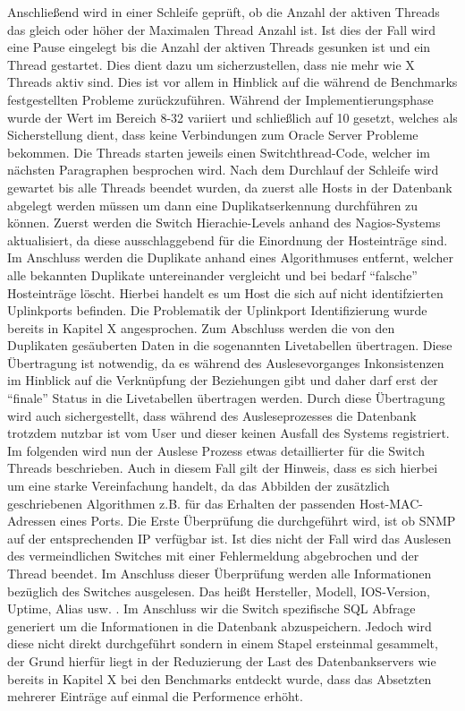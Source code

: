Anschließend wird in einer Schleife geprüft, ob die Anzahl der aktiven Threads das gleich oder höher der Maximalen Thread Anzahl ist. Ist dies der Fall wird eine Pause eingelegt bis die Anzahl der aktiven Threads gesunken ist und ein Thread gestartet. Dies dient dazu um sicherzustellen, dass nie mehr wie X Threads aktiv sind. Dies ist vor allem in Hinblick auf die während de Benchmarks festgestellten Probleme zurückzuführen. Während der Implementierungsphase wurde der Wert im Bereich 8-32 variiert und schließlich auf 10 gesetzt, welches als Sicherstellung dient, dass keine Verbindungen zum Oracle Server Probleme bekommen. Die Threads starten jeweils einen Switchthread-Code, welcher im nächsten Paragraphen besprochen wird. Nach dem Durchlauf der Schleife wird gewartet bis alle Threads beendet wurden, da zuerst alle Hosts in der Datenbank abgelegt werden müssen um dann eine Duplikatserkennung durchführen zu können. Zuerst werden die Switch Hierachie-Levels anhand des Nagios-Systems aktualisiert, da diese ausschlaggebend für die Einordnung der Hosteinträge sind. Im Anschluss werden die Duplikate anhand eines Algorithmuses entfernt, welcher alle bekannten Duplikate untereinander vergleicht und bei bedarf “falsche” Hosteinträge löscht. Hierbei handelt es um Host die sich auf nicht identifzierten Uplinkports befinden. Die Problematik der Uplinkport Identifizierung wurde bereits in Kapitel X angesprochen. Zum Abschluss werden die von den Duplikaten gesäuberten Daten in die sogenannten Livetabellen übertragen. Diese Übertragung ist notwendig, da es während des Auslesevorganges Inkonsistenzen im Hinblick auf die Verknüpfung der Beziehungen gibt und daher darf erst der “finale” Status in die Livetabellen übertragen werden. Durch diese Übertragung wird auch sichergestellt, dass während des Ausleseprozesses die Datenbank trotzdem nutzbar ist vom User und dieser keinen Ausfall des Systems registriert.\\
Im folgenden wird nun der Auslese Prozess etwas detaillierter für die Switch Threads beschrieben. Auch in diesem Fall gilt der Hinweis, dass es sich hierbei um eine starke Vereinfachung handelt, da das Abbilden der zusätzlich geschriebenen Algorithmen z.B. für das Erhalten der passenden Host-MAC-Adressen eines Ports. 
Die Erste Überprüfung die durchgeführt wird, ist ob SNMP auf der entsprechenden IP verfügbar ist. Ist dies nicht der Fall wird das Auslesen des vermeindlichen Switches mit einer Fehlermeldung abgebrochen und der Thread beendet. Im Anschluss dieser Überprüfung werden alle Informationen bezüglich des Switches ausgelesen. Das heißt Hersteller, Modell, IOS-Version, Uptime, Alias usw. . Im Anschluss wir die Switch spezifische SQL Abfrage generiert um die Informationen in die Datenbank abzuspeichern. Jedoch wird diese nicht direkt durchgeführt sondern in einem Stapel ersteinmal gesammelt, der Grund hierfür liegt in der Reduzierung der Last des Datenbankservers wie bereits in Kapitel X bei den Benchmarks entdeckt wurde, dass das Absetzten mehrerer Einträge auf einmal die Performence erhöht.
